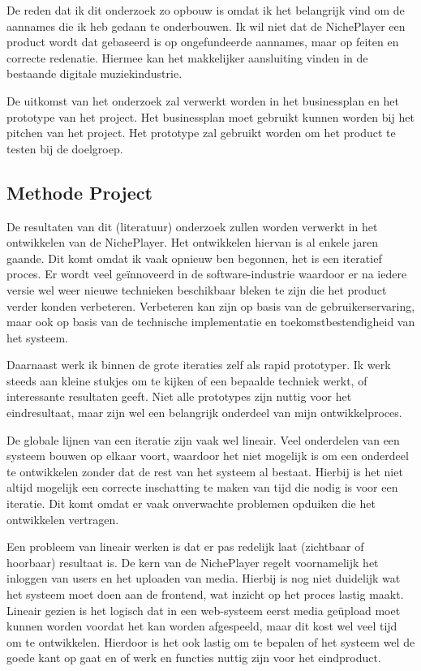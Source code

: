 De reden dat ik dit onderzoek zo opbouw is omdat ik het belangrijk vind om de aannames die ik heb gedaan te onderbouwen. Ik wil niet dat de NichePlayer een product wordt dat gebaseerd is op ongefundeerde aannames, maar op feiten en correcte redenatie. Hiermee kan het makkelijker aansluiting vinden in de bestaande digitale muziekindustrie.

De uitkomst van het onderzoek zal verwerkt worden in het businessplan en het prototype van het project. Het businessplan moet gebruikt kunnen worden bij het pitchen van het project. Het prototype zal gebruikt worden om het product te testen bij de doelgroep.

\subsection{Methode Project}
De resultaten van dit (literatuur) onderzoek zullen worden verwerkt in het ontwikkelen van de NichePlayer. Het ontwikkelen hiervan is al enkele jaren gaande. Dit komt omdat ik vaak opnieuw ben begonnen, het is een iteratief proces. Er wordt veel geïnnoveerd in de software-industrie waardoor er na iedere versie wel weer nieuwe technieken beschikbaar bleken te zijn die het product verder konden verbeteren. Verbeteren kan zijn op basis van de gebruikerservaring, maar ook op basis van de technische implementatie en toekomstbestendigheid van het systeem.

Daarnaast werk ik binnen de grote iteraties zelf als rapid prototyper. Ik werk steeds aan kleine stukjes om te kijken of een bepaalde techniek werkt, of interessante resultaten geeft. Niet alle prototypes zijn nuttig voor het eindresultaat, maar zijn wel een belangrijk onderdeel van mijn ontwikkelproces.

De globale lijnen van een iteratie zijn vaak wel lineair. Veel onderdelen van een systeem bouwen op elkaar voort, waardoor het niet mogelijk is om een onderdeel te ontwikkelen zonder dat de rest van het systeem al bestaat. Hierbij is het niet altijd mogelijk een correcte inschatting te maken van tijd die nodig is voor een iteratie. Dit komt omdat er vaak onverwachte problemen opduiken die het ontwikkelen vertragen.

Een probleem van lineair werken is dat er pas redelijk laat (zichtbaar of hoorbaar) resultaat is. De kern van de NichePlayer regelt voornamelijk het inloggen van users en het uploaden van media. Hierbij is nog niet duidelijk wat het systeem moet doen aan de frontend, wat inzicht op het proces lastig maakt. Lineair gezien is het logisch dat in een web-systeem eerst media geüpload moet kunnen worden voordat het kan worden afgespeeld, maar dit kost wel veel tijd om te ontwikkelen. Hierdoor is het ook lastig om te bepalen of het systeem wel de goede kant op gaat en of werk en functies nuttig zijn voor het eindproduct.

